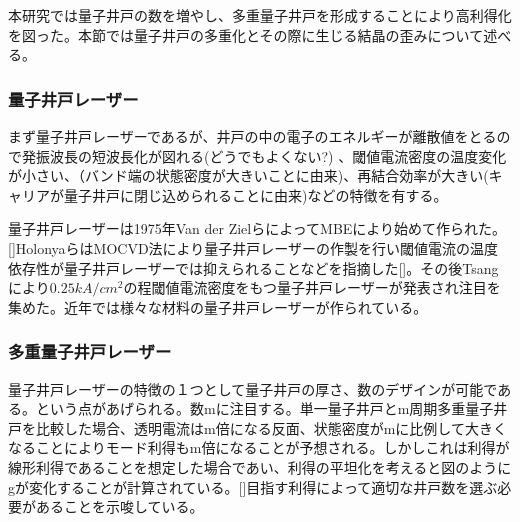 本研究では量子井戸の数を増やし、多重量子井戸を形成することにより高利得化を図った。本節では量子井戸の多重化とその際に生じる結晶の歪みについて述べる。
\subsubsection{量子井戸レーザー}
まず量子井戸レーザーであるが、井戸の中の電子のエネルギーが離散値をとるので発振波長の短波長化が図れる(どうでもよくない?)
、閾値電流密度の温度変化が小さい、（バンド端の状態密度が大きいことに由来)、再結合効率が大きい(キャリアが量子井戸に閉じ込められることに由来)などの特徴を有する。


量子井戸レーザーは1975年Van der ZielらによってMBEにより始めて作られた。[]HolonyaらはMOCVD法により量子井戸レーザーの作製を行い閾値電流の温度依存性が量子井戸レーザーでは抑えられることなどを指摘した[]。その後Tsangにより$0.25kA/cm^{2}$の程閾値電流密度をもつ量子井戸レーザーが発表され注目を集めた。近年では様々な材料の量子井戸レーザーが作られている。
\subsubsection{多重量子井戸レーザー}
量子井戸レーザーの特徴の１つとして量子井戸の厚さ、数のデザインが可能である。という点があげられる。数mに注目する。単一量子井戸とm周期多重量子井戸を比較した場合、透明電流はm倍になる反面、状態密度がmに比例して大きくなることによりモード利得もm倍になることが予想される。しかしこれは利得が線形利得であることを想定した場合であい、利得の平坦化を考えると図のようにgが変化することが計算されている。[]目指す利得によって適切な井戸数を選ぶ必要があることを示唆している。


